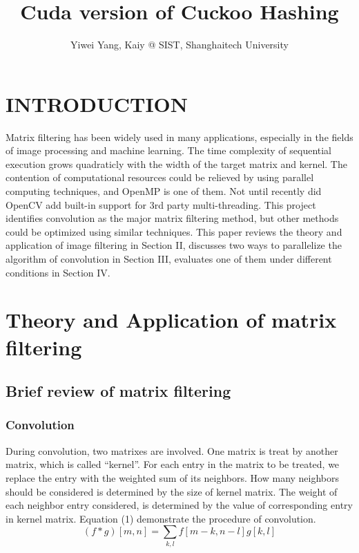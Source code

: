 \documentclass[letterpaper, 10 pt, conference]{ieeeconf}  %
\title{\LARGE \bf
Cuda version of Cuckoo Hashing
}
\author{Yiwei Yang, Kaiy @ SIST, Shanghaitech University%
}
\begin{document}
\maketitle
\thispagestyle{empty}
\pagestyle{empty}






\section{INTRODUCTION}
Matrix filtering has been widely used in many applications, especially in the fields of image processing and machine learning. The time complexity of sequential execution grows quadraticly with the width of the target matrix and kernel. The contention of computational resources could be relieved by using parallel computing techniques, and OpenMP is one of them. Not until recently did OpenCV add built-in support for 3rd party multi-threading. This project identifies convolution as the major matrix filtering method, but other methods could be optimized using similar techniques. This paper reviews the theory and application of image filtering in Section II, discusses two ways to parallelize the algorithm of convolution in Section III, evaluates one of them under different conditions in Section IV.


\section{Theory and Application of matrix filtering}
\subsection{Brief review of matrix filtering}
\subsubsection{Convolution}
During convolution, two matrixes are involved. One matrix is treat by another matrix, which is called “kernel”. For each entry in the matrix to be treated, we replace the entry with the weighted sum of its neighbors. How many neighbors should be considered is determined by the size of kernel matrix. The weight of each neighbor entry considered, is determined by the value of corresponding entry in kernel matrix. Equation (1) demonstrate the procedure of convolution.
\begin{equation}
	(f*g)[m,n] = \sum_{k,l}f[m-k,n-l]g[k,l]
\end{equation}
\end{document}
